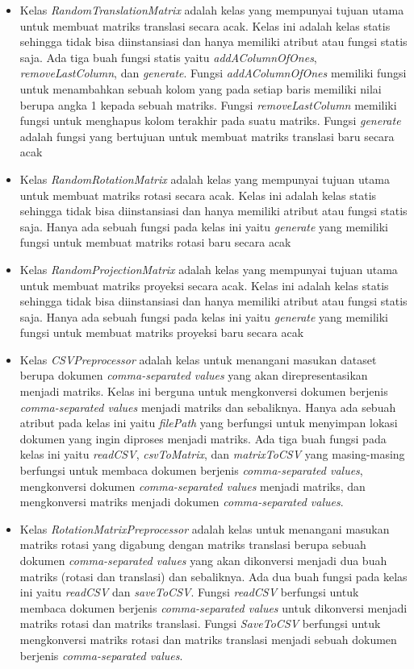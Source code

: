 \begin{itemize}
    \item Kelas \textit{RandomTranslationMatrix} adalah kelas yang mempunyai tujuan utama untuk membuat matriks translasi secara acak. Kelas ini adalah kelas statis sehingga tidak bisa diinstansiasi dan hanya memiliki atribut atau fungsi statis saja. Ada tiga buah fungsi statis yaitu \textit{addAColumnOfOnes}, \textit{removeLastColumn}, dan \textit{generate}. Fungsi \textit{addAColumnOfOnes} memiliki fungsi untuk menambahkan sebuah kolom yang pada setiap baris memiliki nilai berupa angka 1 kepada sebuah matriks. Fungsi \textit{removeLastColumn} memiliki fungsi untuk menghapus kolom terakhir pada suatu matriks. Fungsi \textit{generate} adalah fungsi yang bertujuan untuk membuat matriks translasi baru secara acak
    \item Kelas \textit{RandomRotationMatrix} adalah kelas yang mempunyai tujuan utama untuk membuat matriks rotasi secara acak. Kelas ini adalah kelas statis sehingga tidak bisa diinstansiasi dan hanya memiliki atribut atau fungsi statis saja. Hanya ada sebuah fungsi pada kelas ini yaitu \textit{generate} yang memiliki fungsi untuk membuat matriks rotasi baru secara acak
    \item Kelas \textit{RandomProjectionMatrix} adalah kelas yang mempunyai tujuan utama untuk membuat matriks proyeksi secara acak. Kelas ini adalah kelas statis sehingga tidak bisa diinstansiasi dan hanya memiliki atribut atau fungsi statis saja. Hanya ada sebuah fungsi pada kelas ini yaitu \textit{generate} yang memiliki fungsi untuk membuat matriks proyeksi baru secara acak
    \item Kelas \textit{CSVPreprocessor} adalah kelas untuk menangani masukan dataset berupa dokumen \textit{comma-separated values} yang akan direpresentasikan menjadi matriks. Kelas ini berguna untuk mengkonversi dokumen berjenis \textit{comma-separated values} menjadi matriks dan sebaliknya. Hanya ada sebuah atribut pada kelas ini yaitu \textit{filePath} yang berfungsi untuk menyimpan lokasi dokumen yang ingin diproses menjadi matriks. Ada tiga buah fungsi pada kelas ini yaitu \textit{readCSV}, \textit{csvToMatrix}, dan \textit{matrixToCSV} yang masing-masing berfungsi untuk membaca dokumen berjenis \textit{comma-separated values}, mengkonversi dokumen \textit{comma-separated values} menjadi matriks, dan mengkonversi matriks menjadi dokumen \textit{comma-separated values}.
    \item Kelas \textit{RotationMatrixPreprocessor} adalah kelas untuk menangani masukan matriks rotasi yang digabung dengan matriks translasi berupa sebuah dokumen \textit{comma-separated values} yang akan dikonversi menjadi dua buah matriks (rotasi dan translasi) dan sebaliknya. Ada dua buah fungsi pada kelas ini yaitu \textit{readCSV} dan \textit{saveToCSV}. Fungsi \textit{readCSV} berfungsi untuk membaca dokumen berjenis \textit{comma-separated values} untuk dikonversi menjadi matriks rotasi dan matriks translasi. Fungsi \textit{SaveToCSV} berfungsi untuk mengkonversi matriks rotasi dan matriks translasi menjadi sebuah dokumen berjenis \textit{comma-separated values}.

\end{itemize}
